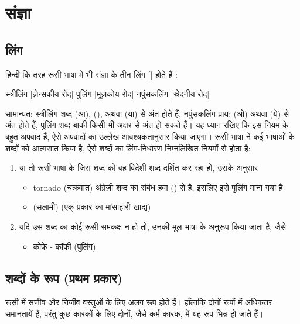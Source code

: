 \chapter{संज्ञा}\label{ch: noun}


\section{लिंग}\label{sec:noun-gender}
हिन्दी कि तरह रूसी भाषा में भी संज्ञा के तीन लिंग []  होते हैं :

स्त्रीलिंग   [ज़ेन्सकीय रोद]
पुलिंग  [मूज़कोय रोद]
नपुंसकलिंग  [स्रेदनीय रोद]

सामान्यत: स्त्रीलिंग शब्द  (आ),  (),  अथवा  (या)  से अंत होते हैं, नपुंसकलिंग प्राय:  (ओ) अथवा
 (ये) से अंत होते हैं, पुलिंग शब्द बाकी किसी भी अक्षर से अंत हो सकते हैं। यह ध्यान रखिए कि इस नियम के बहुत अपवाद हैं, ऐसे अपवादों का उल्लेख
आवश्यकतानुसार किया जाएगा। रूसी भाषा ने कई भाषाओं के शब्दों को आत्मसात किया है, ऐसे शब्दों का लिंग-निर्धारण निम्नलिखित नियमों से होता है:
\begin{enumerate}
    \item या तो रूसी भाषा के जिस शब्द को वह विदेशी शब्द दर्शित कर रहा हो, उसके अनुसार
    \begin{itemize}
        \item tornado (चक्रवात) अंग्रेज़ी शब्द का संबंध हवा () से है, इसलिए इसे पुलिंग माना गया है
        \item (सलामी) (एक् प्रकार का मांसाहारी खाद्य)
    \end{itemize}
    \item  यदि उस शब्द का कोई रूसी समकक्ष न हो तो, उनकी मूल भाषा के अनुरूप किया जाता है, जैसे
    \begin{itemize}
        \item कोफे - कॉफी (पुलिंग)
    \end{itemize}
\end{enumerate}


\section{शब्दों के रूप (प्रथम प्रकार)}\label{sec:noun-endings-first-declension}
रूसी में सजीव और निर्जीव वस्तुओं के लिए अलग रूप होते हैं। हाँलाकि दोनों रूपों में अधिकतर समानतायें हैं, परंतु कुछ कारकों के लिए दोनों, जैसे कर्म कारक, में यह
रूप भिन्न हो जाते हैं।

